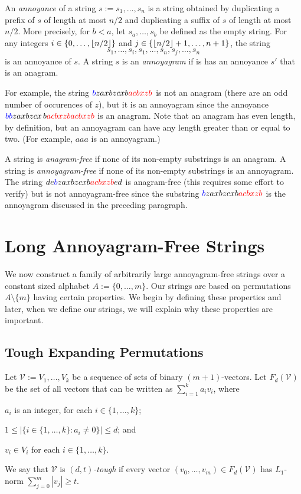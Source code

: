 \documentclass[kpfonts]{patmorin}
\newcommand{\colored}[2]{{\color{#1}#2}}
\begin{document}
An \emph{annoyance} of a string $s:=s_1,\ldots,s_n$ is a string obtained by duplicating a prefix of $s$ of length at most $n/2$ and duplicating a suffix of $s$ of length at most $n/2$.  More precisely, for $b <a$, let $s_a,\ldots,s_b$ be defined as the empty string.  For any integers $i\in\{0,\ldots,{\lfloor n/2 \rfloor}\}$ and $j\in\{{\lfloor n/2 \rfloor}+1,\ldots,n+1\}$, the string
\[
    s_1,\ldots,s_{i}, s_1,\ldots,s_n,s_{j},\ldots,s_n
\]
is an annoyance of $s$. A string $s$ is an \emph{annoyagram} if is has an annoyance $s'$ that is an anagram.

For example, the string $\colored{blue}{b}zaxbzcxb\colored{red}{acbxzb}$ is not an anagram (there are an odd number of occurences of $z$), but it is an annoyagram since the annoyance $\colored{blue}{bb}zaxbzcx\,b\colored{red}{acbxzb acbxzb}$ is an anagram.  Note that an anagram has even length, by definition, but an annoyagram can have any length greater than or equal to two. (For example, $aaa$ is an annoyagram.)

A string is \emph{anagram-free} if none of its non-empty substrings is an anagram. A string is \emph{annoyagram-free} if none of its non-empty substrings is an annoyagram. The string $de\colored{blue}{b}zaxbzcxb\colored{red}{acbxzb}ed$ is anagram-free (this requires some effort to verify) but is not annoyagram-free since the substring $\colored{blue}{b}zaxbzcxb\colored{red}{acbxzb}$ is the annoyagram discussed in the preceding paragraph.

\section{Long Annoyagram-Free Strings}

We now construct a family of arbitrarily large annoyagram-free strings over a constant sized alphabet $A:=\{0,\ldots,m\}$.
Our strings are based on permutations $A\setminus\{m\}$ having certain properties.  We begin by defining these properties and later, when we define our strings, we will explain why these properties are important.

\subsection{Tough Expanding Permutations}
\label{permutations}

Let $\mathcal{V}:=V_1,\ldots,V_k$ be a sequence of sets of binary $(m+1)$-vectors.  Let $F_d(\mathcal{V})$ be the set of all vectors that can be written as $\sum_{i=1}^k a_iv_i$, where
\begin{compactenum}
    \item $a_i$ is an integer, for each $i\in\{1,\ldots,k\}$;
    \item $1\le |\{i\in\{1,\ldots,k\}:a_i\neq 0\}| \le d$; and
    \item $v_i\in V_i$ for each $i\in\{1,\ldots,k\}$.
\end{compactenum}
We say that $\mathcal{V}$ is \emph{$(d,t)$-tough} if every vector $(v_0,\ldots,v_m)\in F_d(\mathcal{V})$ has $L_1$-norm $\sum_{j=0}^m |v_j| \ge t$.
\end{document}
